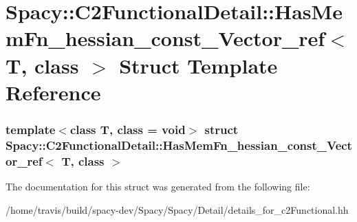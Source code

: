 \hypertarget{structSpacy_1_1C2FunctionalDetail_1_1HasMemFn__hessian__const__Vector__ref}{\section{\-Spacy\-:\-:\-C2\-Functional\-Detail\-:\-:\-Has\-Mem\-Fn\-\_\-hessian\-\_\-const\-\_\-\-Vector\-\_\-ref$<$ \-T, class $>$ \-Struct \-Template \-Reference}
\label{structSpacy_1_1C2FunctionalDetail_1_1HasMemFn__hessian__const__Vector__ref}
}
\subsubsection*{template$<$class T, class = void$>$ struct Spacy\-::\-C2\-Functional\-Detail\-::\-Has\-Mem\-Fn\-\_\-hessian\-\_\-const\-\_\-\-Vector\-\_\-ref$<$ T, class $>$}



\-The documentation for this struct was generated from the following file\-:\begin{DoxyCompactItemize}
\item 
/home/travis/build/spacy-\/dev/\-Spacy/\-Spacy/\-Detail/details\-\_\-for\-\_\-c2\-Functional.\-hh\end{DoxyCompactItemize}
